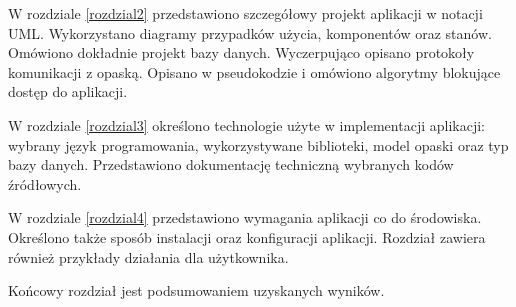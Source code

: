 W rozdziale \ref{rozdzial2} przedstawiono szczegółowy projekt aplikacji w notacji UML. Wykorzystano diagramy przypadków użycia, komponentów oraz stanów. Omówiono dokładnie projekt bazy danych. Wyczerpująco opisano protokoły komunikacji z opaską. Opisano w pseudokodzie i omówiono algorytmy blokujące dostęp do aplikacji. 

W rozdziale \ref{rozdzial3} określono technologie użyte w implementacji aplikacji: wybrany język programowania, wykorzystywane biblioteki, model opaski oraz typ bazy danych. Przedstawiono dokumentację techniczną wybranych kodów źródłowych. 

W rozdziale \ref{rozdzial4} przedstawiono wymagania aplikacji co do środowiska. Określono także sposób instalacji oraz konfiguracji aplikacji. Rozdział zawiera również przykłady działania dla użytkownika.

Końcowy rozdział jest podsumowaniem uzyskanych wyników.



